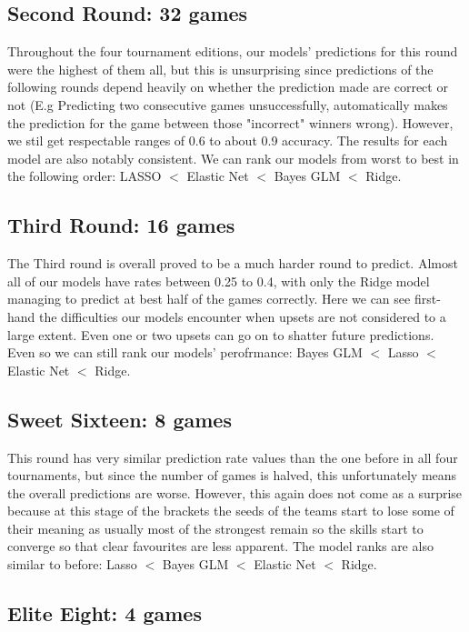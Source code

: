 \documentclass{article} %
\begin{document}
\subsection{Second Round: 32 games}

Throughout the four tournament editions, our models' predictions for this round were the highest of them all, but this is unsurprising since predictions of the following rounds depend heavily on whether the prediction made are correct or not (E.g Predicting two consecutive games unsuccessfully, automatically makes the prediction for the game between those "incorrect" winners wrong). However, we stil get respectable ranges of 0.6 to about 0.9 accuracy. The results for each model are also notably consistent. We can rank our models from worst to best in the following order: LASSO $<$ Elastic Net $<$ Bayes GLM $<$ Ridge.

\subsection{Third Round: 16 games}

The Third round is overall proved to be a much harder round to predict. Almost all of our models have rates between 0.25 to 0.4, with only the Ridge model managing to predict at best half of the games correctly. Here we can see first-hand the difficulties our models encounter when upsets are not considered to a large extent. Even one or two upsets can go on to shatter future predictions. Even so we can still rank our models' perofrmance: Bayes GLM $<$ Lasso $<$ Elastic Net $<$ Ridge.

\subsection{Sweet Sixteen: 8 games}

This round has very similar prediction rate values than the one before in all four tournaments, but since the number of games is halved, this unfortunately means the overall predictions are worse. However, this again does not come as a surprise because at this stage of the brackets the seeds of the teams start to lose some of their meaning as usually most of the strongest remain so the skills start to converge so that clear favourites are less apparent. The model ranks are also similar to before: Lasso $<$ Bayes GLM $<$ Elastic Net $<$ Ridge.   

\subsection{Elite Eight: 4 games}
\end{document}
